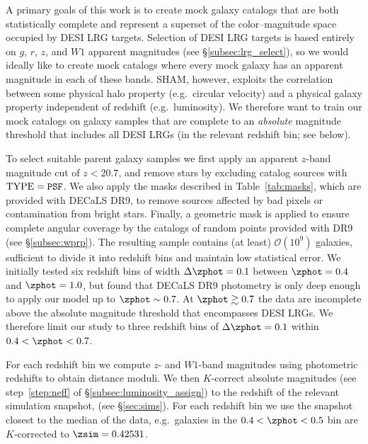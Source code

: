 \documentclass[twocolumn,apj,iop,tighten]{emulateapj2}
\begin{document}
A primary goals of this work is to create mock galaxy catalogs that are both statistically complete and represent a superset of the color--magnitude space occupied by DESI LRG targets. Selection of DESI LRG targets is based entirely on $g$, $r$, $z$, and $W1$ apparent magnitudes (see \S\ref{subsec:lrg_select}), so we would ideally like to create mock catalogs where every mock galaxy has an apparent magnitude in each of these bands. SHAM, however, exploits the correlation between some physical halo property (e.g.\ circular velocity) and a physical galaxy property independent of redshift (e.g.\ luminosity). We therefore want to train our mock catalogs on galaxy samples that are complete to an \emph{absolute} magnitude threshold that includes all DESI LRGs (in the relevant redshift bin; see below).

To select suitable parent galaxy samples we first apply an apparent $z$-band magnitude cut of $z < 20.7$, and remove stars by excluding catalog sources with ${\rm TYPE} = \texttt{PSF}$. We also apply the masks described in Table~\ref{tab:masks}, which are provided with DECaLS DR9, to remove sources affected by bad pixels or contamination from bright stars. Finally, a geometric mask is applied to ensure complete angular coverage by the catalogs of random points provided with DR9 (see \S\ref{subsec:wprp}). The resulting sample contains (at least) $\mathcal{O}(10^9)$ galaxies, sufficient to divide it into redshift bins and maintain low statistical error. We initially tested six redshift bins of width $\Delta\zphot=0.1$ between $\zphot=0.4$ and $\zphot=1.0$, but found that DECaLS DR9 photometry is only deep enough to apply our model up to $\zphot \sim 0.7$. At $\zphot \gtrsim 0.7$ the data are incomplete above the absolute magnitude threshold that encompasses DESI LRGs. We therefore limit our study to three redshift bins of $\Delta\zphot=0.1$ within $0.4 < \zphot < 0.7$.

For each redshift bin we compute $z$- and $W1$-band magnitudes using \citet{zhou_etal20b} photometric redshifts to obtain distance moduli. We then $K$-correct absolute magnitudes (see step~\ref{step:neff} of \S\ref{subsec:luminosity_assign}) to the redshift of the relevant simulation snapshot, \zsim (see \S\ref{sec:sims}). For each redshift bin we use the snapshot closest to the median \zphot of the data, e.g.\ galaxies in the ${0.4 < \zphot < 0.5}$ bin are $K$-corrected to $\zsim=0.42531$.
\end{document}
